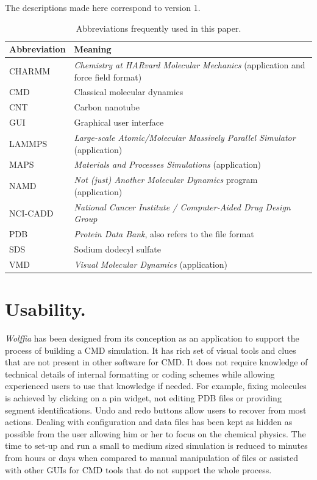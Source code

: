 \documentclass{article}
\begin{document}
The descriptions made here correspond to version 1.

\begin{table}
  \label{tbl:abbreviations}
  \begin{tabular}{ll}
    \hline
    \textbf{Abbreviation}  & \textbf{Meaning}\\    
    \hline
	CHARMM & \textit{Chemistry at HARvard Molecular Mechanics} (application and force field format)\\
	CMD  & Classical molecular dynamics \\
	CNT    & Carbon nanotube\\
	GUI    & Graphical user interface \\
	LAMMPS & \textit{Large-scale Atomic/Molecular Massively Parallel Simulator} (application)\\
	MAPS & \textit{Materials and Processes Simulations} (application) \\
	NAMD & \textit{Not (just) Another Molecular Dynamics} program (application)\\
	NCI-CADD & \textit{National Cancer Institute / Computer-Aided Drug Design Group} \\
	PDB    & \textit{Protein Data Bank}, also refers to the file format \\
	SDS    & Sodium dodecyl sulfate\\
	VMD  & \textit{Visual Molecular Dynamics} (application) \\
    \hline
  \end{tabular}
  \caption{Abbreviations frequently used in this paper.}
\end{table}


\section{Usability.} 
\textit{Wolffia} has been designed from its conception as an application to support the process of building a CMD simulation.  It has  rich set of visual tools and clues that are not present in other software for CMD.  It does not require knowledge of technical details of internal formatting or coding schemes while allowing experienced users to use that knowledge if needed.  For example, fixing molecules is achieved by clicking on a pin widget, not editing PDB files or providing segment identifications.  Undo and redo buttons allow users to recover from most actions.  
Dealing with configuration and data files has been kept as hidden as possible from the user allowing him or her to focus on the chemical physics.  The time to set-up and run a small to medium sized simulation is reduced to minutes from hours or days when compared to manual manipulation of files or assisted with other GUIs for CMD tools that do not support the whole process.
\end{document}
